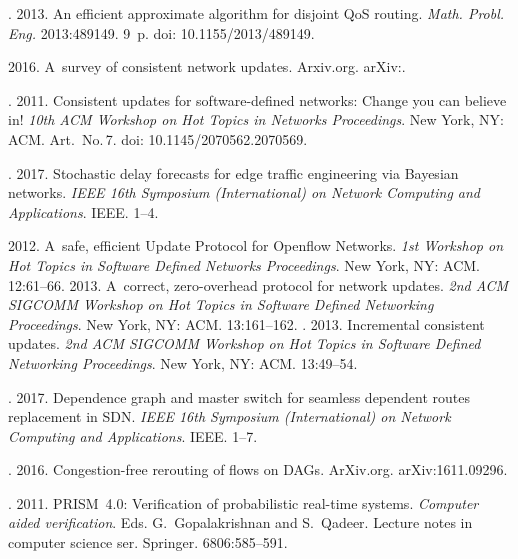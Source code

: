 \begin{multicols}{2}
{{\begin{thebibliography}{99}
. 2013. 
An efficient approximate algorithm for disjoint QoS routing.
\textit{Math. Probl. Eng.} 2013:489149. 9~p. 
doi: 10.1155/2013/489149.

 2016. 
A~survey of consistent network updates. \mbox{Arxiv.org}. \mbox{arXiv}:.

. 
2011. Consistent updates for software-defined networks: Change you can believe in! 
\textit{10th ACM Workshop on Hot Topics in Networks Proceedings}.
New York, NY: ACM. Art.\ No.\,7. doi: 10.1145/2070562.2070569.

. 
2017. Stochastic delay forecasts for edge traffic engineering via Bayesian networks. 
\textit{IEEE 16th Symposium (International) on Network Computing and Applications}. 
IEEE. 1--4.

 2012. A~safe, efficient Update Protocol for Openflow Networks. 
\textit{1st Workshop on Hot Topics in Software Defined Networks Proceedings}. 
New York, NY: ACM. 12:61--66.
 2013. A~correct, zero-overhead protocol for network updates. 
\textit{2nd ACM SIGCOMM Workshop on Hot Topics in Software Defined Networking
Proceedings}. New York, NY: ACM. 13:161--162.
. 
2013. Incremental consistent updates. \textit{2nd ACM SIGCOMM Workshop on Hot Topics 
in Software Defined Networking Proceedings}.
New York, NY: ACM. 13:49--54.

. 
2017. Dependence graph and master switch for seamless dependent routes 
replacement in SDN. \textit{IEEE 16th Symposium 
(International) on Network Computing and Applications}. IEEE. 1--7.

.
2016. Congestion-free rerouting of flows
on DAGs. \mbox{ArXiv}.org. arXiv:1611.09296.

. 2011. 
PRISM~4.0: Verification of probabilistic real-time systems. 
\textit{Computer aided verification}.
Eds. G.~Gopalakrishnan and S.~Qadeer.
Lecture notes in computer science ser. Springer.
6806:585--591.


\end{thebibliography}}}
\end{multicols}
